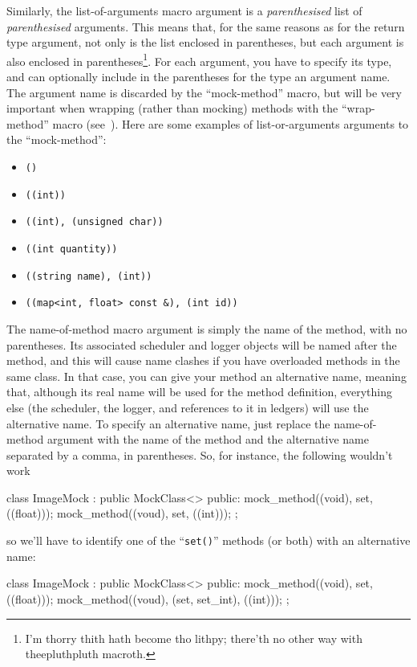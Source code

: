 \documentclass[twoside, a4paper, article]{memoir}
\begin{document}
Similarly, the list-of-arguments macro argument is a \emph{parenthesised} list
of \emph{parenthesised} arguments.  This means that, for the same reasons as
for the return type argument, not only is the list enclosed in parentheses, but
each argument is also enclosed in parentheses\footnote{I'm thorry thith hath
  become tho lithpy; there'th no other way with theepluthpluth macroth.}.  For
each argument, you have to specify its type, and can optionally include in the
parentheses for the type an argument name.  The argument name is discarded by
the ``mock-method'' macro, but will be very important when wrapping (rather
than mocking) methods with the ``wrap-method'' macro
(see~).  Here are some examples of list-or-arguments
arguments to the ``mock-method'':
\begin{itemize}
\item \texttt{()}
\item \texttt{((int))}
\item \texttt{((int), (unsigned char))}
\item \texttt{((int quantity))}
\item \texttt{((string name), (int))}
\item \texttt{((map<int, float> const \&), (int id))}
\end{itemize}

The name-of-method macro argument is simply the name of the method, with no
parentheses.  Its associated scheduler and logger objects will be named after
the method, and this will cause name clashes if you have overloaded methods in
the same class.  In that case, you can give your method an alternative name,
meaning that, although its real name will be used for the method definition,
everything else (the scheduler, the logger, and references to it in ledgers)
will use the alternative name.  To specify an alternative name, just replace
the name-of-method argument with the name of the method and the alternative
name separated by a comma, in parentheses.  So, for instance, the following
wouldn't work
\begin{cpplisting}
class ImageMock
  : public MockClass<> {
public:
  mock_method((void), set, ((float)));
  mock_method((voud), set, ((int)));
};
\end{cpplisting}
so we'll have to identify one of the ``\texttt{set()}'' methods (or both) with
an alternative name:
\begin{cpplisting}
class ImageMock
  : public MockClass<> {
public:
  mock_method((void), set, ((float)));
  mock_method((voud), (set, set_int), ((int)));
};
\end{cpplisting}
\end{document}
